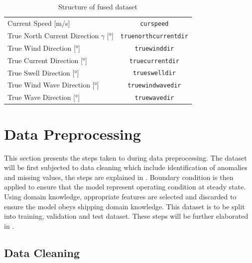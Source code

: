 \begin{table}
{\begin{tabular}{ p{} c }
    Current Speed [m/s] & {\tt curspeed} \\
    True North Current Direction $\gamma$ [°] & {\tt truenorthcurrentdir}\\
    True Wind Direction [°] & {\tt truewinddir}  \\
    True Current Direction [°] & {\tt truecurrentdir} \\
    True Swell Direction [°] & {\tt trueswelldir} \\
    True Wind Wave Direction [°] & {\tt truewindwavedir} \\
    True Wave Direction [°] & {\tt truewavedir} \\
    \end{tabular}}
\caption{Structure of fused dataset}\label{tbl:dataset_init_struct}
\end{table}

\section{Data Preprocessing}\label{sec:data_prep}

This section presents the steps taken to during data preprocessing. The dataset will be first subjected to data cleaning which include identification of anomalies and missing values, the steps are explained in . Boundary condition is then applied to ensure that the model represent operating condition at steady state. Using domain knowledge, appropriate features are selected and discarded to ensure the model obeys shipping domain knowledge. This dataset is to be split into training, validation and test dataset. These steps will be further elaborated in .

\subsection{Data Cleaning}\label{sec:data_cleaning}

